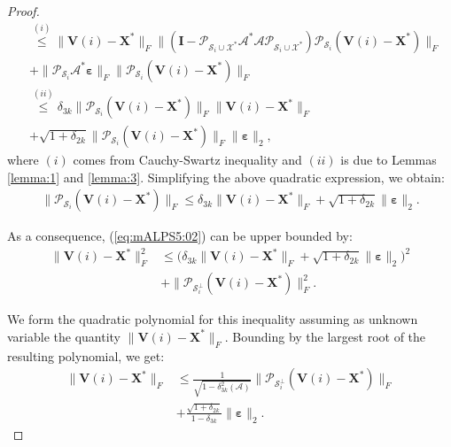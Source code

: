 \documentclass[twocolumn]{svjour3}
\newcommand{\vectornormbig}[1]{\big\|#1\big\|}
\newcommand{\sensing}{\boldsymbol{\mathcal{A}}}
\newcommand{\bestsignal}{\boldsymbol{X}^\ast}
\newcommand{\noise}{\boldsymbol{\varepsilon}}
\newcommand{\id}{\mathbf{I}}
\newcommand{\rank}{k}
\begin{document}
\begin{proof}
\begin{align}
					&\stackrel{(i)}{\leq} \vectornormbig{\boldsymbol{V}(i) - \bestsignal}_F\vectornormbig{ (\id - \mathcal{P}_{\mathcal{S}_i \cup \mathcal{X}^\ast}\sensing^\ast \sensing\mathcal{P}_{\mathcal{S}_i \cup \mathcal{X}^\ast})\mathcal{P}_{\mathcal{S}_i}(\boldsymbol{V}(i) - \bestsignal)}_F \nonumber \\ &+ \vectornormbig{\mathcal{P}_{\mathcal{S}_i}\sensing^\ast \noise}_F \vectornormbig{\mathcal{P}_{\mathcal{S}_i}(\boldsymbol{V}(i) - \bestsignal)}_F \nonumber \\
                    &\stackrel{(ii)}{\leq} \delta_{3\rank} \vectornormbig{\mathcal{P}_{\mathcal{S}_i}(\boldsymbol{V}(i) - \bestsignal)}_F \vectornormbig{\boldsymbol{V}(i) - \bestsignal}_F \nonumber \\ &+ \sqrt{1+\delta_{2\rank}} \vectornormbig{\mathcal{P}_{\mathcal{S}_i}(\boldsymbol{V}(i) - \bestsignal)}_F \vectornormbig{\noise}_2,  \label{eq:mALPS5:09}                           
\end{align} where $ (i) $ comes from Cauchy-Swartz inequality and $ (ii) $ is due to Lemmas \ref{lemma:1} and \ref{lemma:3}. Simplifying the above quadratic expression, we obtain: 
\begin{align}
\vectornormbig{\mathcal{P}_{\mathcal{S}_i}(\boldsymbol{V}(i) - \bestsignal)}_F \leq \delta_{3\rank} \vectornormbig{\boldsymbol{V}(i) - \bestsignal}_F + \sqrt{1+\delta_{2\rank}} \vectornormbig{\noise}_2. \label{eq:mALPS5:10}                           
\end{align}

As a consequence, (\ref{eq:mALPS5:02}) can be upper bounded by:
\begin{align}
\vectornormbig{\boldsymbol{V}(i) - \bestsignal}_F^2 &\leq \big(\delta_{3\rank} \vectornormbig{\boldsymbol{V}(i) - \bestsignal}_F + \sqrt{1+\delta_{2\rank}} \vectornormbig{\noise}_2\big)^2 \nonumber \\ &+ \vectornormbig{\mathcal{P}_{\mathcal{S}_i^{\bot}}(\boldsymbol{V}(i) - \bestsignal)}_F^2. \label{eq:mALPS5:11}                           
\end{align}

We form the quadratic polynomial for this inequality assuming as unknown variable the quantity $ \vectornormbig{\boldsymbol{V}(i) - \bestsignal}_F $. Bounding by the largest root of the resulting polynomial, we get:
\begin{align}
\vectornormbig{\boldsymbol{V}(i) - \bestsignal}_F &\leq \frac{1}{\sqrt{1-\delta_{3\rank}^2(\sensing)}} \vectornormbig{\mathcal{P}_{\mathcal{S}_i^{\bot}}(\boldsymbol{V}(i) - \bestsignal)}_F \nonumber \\ &+ \frac{\sqrt{1+\delta_{2\rank}}}{1-\delta_{3\rank}} \vectornormbig{\noise}_2.\label{eq:mALPS5:12a}
\end{align} 
\end{proof}
\end{document}
